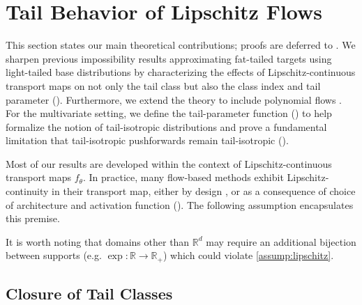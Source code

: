 \documentclass[thesis.tex]{subfiles}
\begin{document}
\section{Tail Behavior of Lipschitz Flows}

\vspace{-1mm}
This section states our main theoretical contributions; proofs are deferred to .
We sharpen previous impossibility results approximating fat-tailed targets
using light-tailed base distributions \citep[Theorem 4]{jaini2020tails}
by characterizing the effects of Lipschitz-continuous transport maps on not only the tail class
but also the class index and tail parameter (). Furthermore, we extend the theory
to include polynomial flows \citep{jaini2019sum}. For the multivariate setting,
we define the tail-parameter function () to help formalize the notion
of tail-isotropic distributions and prove a fundamental limitation that tail-isotropic
pushforwards remain tail-isotropic ().

Most of our results are developed within the context of Lipschitz-continuous transport maps $f_\theta$.
In practice, many flow-based methods exhibit Lipschitz-continuity in their transport map, either by design \citep{grathwohl2018ffjord,chen2019residual}, or as a consequence of choice of architecture and activation function (). %
%
The following assumption encapsulates this premise.
It is worth noting that domains other than $\mathbb{R}^d$ may require an additional bijection between supports (e.g. $\exp : \mathbb{R} \to \mathbb{R}_+$) which
could violate \cref{assump:lipschitz}.

\vspace{-2mm}
\subsection{Closure of Tail Classes}
\label{ssec:failure}
\end{document}
